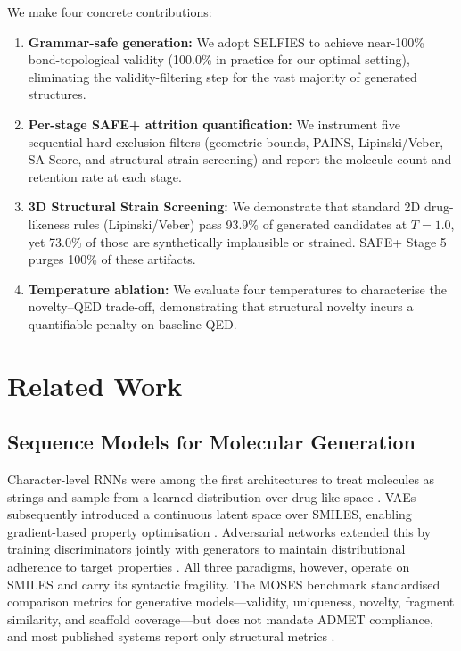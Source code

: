 \documentclass[conference]{IEEEtran}
\begin{document}
We make four concrete contributions:
\begin{enumerate}
    \item \textbf{Grammar-safe generation:} We adopt SELFIES to achieve near-100\% bond-topological validity (100.0\% in practice for our optimal setting), eliminating the validity-filtering step for the vast majority of generated structures.
    \item \textbf{Per-stage SAFE+ attrition quantification:} We instrument five sequential hard-exclusion filters (geometric bounds, PAINS, Lipinski/Veber, SA Score, and structural strain screening) and report the molecule count and retention rate at each stage.
    \item \textbf{3D Structural Strain Screening:} We demonstrate that standard 2D drug-likeness rules (Lipinski/Veber) pass 93.9\% of generated candidates at $T{=}1.0$, yet 73.0\% of those are synthetically implausible or strained. SAFE+ Stage 5 purges 100\% of these artifacts.
    \item \textbf{Temperature ablation:} We evaluate four temperatures to characterise the novelty--QED trade-off, demonstrating that structural novelty incurs a quantifiable penalty on baseline QED.
\end{enumerate}


\section{Related Work}

\subsection{Sequence Models for Molecular Generation}

Character-level RNNs were among the first architectures to treat molecules as strings and sample from a learned distribution over drug-like space \cite{ref6}. VAEs subsequently introduced a continuous latent space over SMILES, enabling gradient-based property optimisation \cite{ref1}. Adversarial networks extended this by training discriminators jointly with generators to maintain distributional adherence to target properties \cite{ref7}. All three paradigms, however, operate on SMILES and carry its syntactic fragility. The MOSES benchmark \cite{ref11} standardised comparison metrics for generative models---validity, uniqueness, novelty, fragment similarity, and scaffold coverage---but does not mandate ADMET compliance, and most published systems report only structural metrics \cite{ref12, ref13}.
\end{document}
